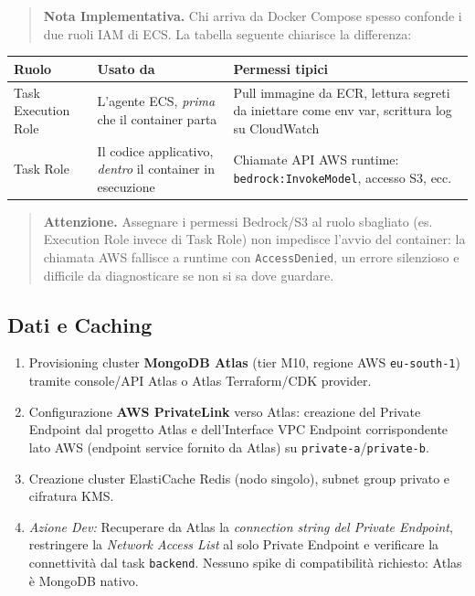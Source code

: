 \documentclass[11pt,a4paper]{article}
\begin{document}
\begin{quote}
\textbf{Nota Implementativa.} Chi arriva da Docker Compose spesso confonde i due ruoli IAM di ECS. La tabella seguente chiarisce la differenza:
\end{quote}

\begin{table}[H]
\centering
\renewcommand{\arraystretch}{1.2}
\begin{tabularx}{\textwidth}{|l|X|X|}
\hline
\textbf{Ruolo} & \textbf{Usato da} & \textbf{Permessi tipici} \\ \hline
Task Execution Role & L'agente ECS, \emph{prima} che il container parta & Pull immagine da ECR, lettura segreti da iniettare come env var, scrittura log su CloudWatch \\ \hline
Task Role & Il codice applicativo, \emph{dentro} il container in esecuzione & Chiamate API AWS runtime: \texttt{bedrock:InvokeModel}, accesso S3, ecc. \\ \hline
\end{tabularx}
\end{table}

\begin{quote}
\textbf{Attenzione.} Assegnare i permessi Bedrock/S3 al ruolo sbagliato (es. Execution Role invece di Task Role) non impedisce l'avvio del container: la chiamata AWS fallisce a runtime con \texttt{AccessDenied}, un errore silenzioso e difficile da diagnosticare se non si sa dove guardare.
\end{quote}

\subsection{Dati e Caching}

\begin{enumerate}
    \item Provisioning cluster \textbf{MongoDB Atlas} (tier M10, regione AWS \texttt{eu-south-1}) tramite console/API Atlas o Atlas Terraform/CDK provider.
    \item Configurazione \textbf{AWS PrivateLink} verso Atlas: creazione del Private Endpoint dal progetto Atlas e dell'Interface VPC Endpoint corrispondente lato AWS (endpoint service fornito da Atlas) su \texttt{private-a}/\texttt{private-b}.
    \item Creazione cluster ElastiCache Redis (nodo singolo), subnet group privato e cifratura KMS.
    \item \emph{Azione Dev:} Recuperare da Atlas la \emph{connection string del Private Endpoint}, restringere la \emph{Network Access List} al solo Private Endpoint e verificare la connettività dal task \texttt{backend}. Nessuno spike di compatibilità richiesto: Atlas è MongoDB nativo.
\end{enumerate}
\end{document}
